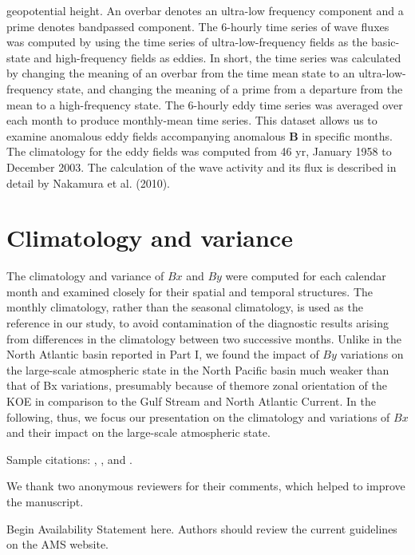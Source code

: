 \documentclass{ametsocv6.2}
\begin{document}
geopotential height. An overbar denotes an ultra-low frequency
component and a prime denotes bandpassed
component. The 6-hourly time series of wave fluxes was
computed by using the time series of ultra-low-frequency
fields as the basic-state and high-frequency fields as eddies.
In short, the time series was calculated by changing the
meaning of an overbar from the time mean state to an
ultra-low-frequency state, and changing the meaning of a
prime from a departure from the mean to a high-frequency
state. The 6-hourly eddy time series was averaged over each
month to produce monthly-mean time series. This dataset
allows us to examine anomalous eddy fields accompanying
anomalous $\mathbf B$ in specific months. The climatology for
the eddy fields was computed from 46 yr, January 1958 to
December 2003. The calculation of the wave activity and
its flux is described in detail by Nakamura et al. (2010).


\section{Climatology and variance}
The climatology and variance of $Bx$ and $By$ were computed
for each calendar month and examined closely for
their spatial and temporal structures. The monthly climatology,
rather than the seasonal climatology, is used as the
reference in our study, to avoid contamination of the diagnostic
results arising from differences in the climatology
between two successive months. Unlike in the North Atlantic
basin reported in Part I, we found the impact of $By$
variations on the large-scale atmospheric state in the
North Pacific basin much weaker than that of Bx variations,
presumably because of themore zonal orientation of
the KOE in comparison to the Gulf Stream and North
Atlantic Current. In the following, thus, we focus our
presentation on the climatology and variations of $Bx$ and
their impact on the large-scale atmospheric state.

Sample citations: \citet{Becker+Schmitz2003}, \citet{Knutti2008},
and \citep{MeixnerEA2002,Kuji_Nakajima2002,EmeryEA1986}.

\acknowledgments
We thank two anonymous reviewers for their comments, which helped
to improve the manuscript.

\availstatement
Begin Availability Statement here. Authors should review the current guidelines
on the AMS website.
\end{document}
